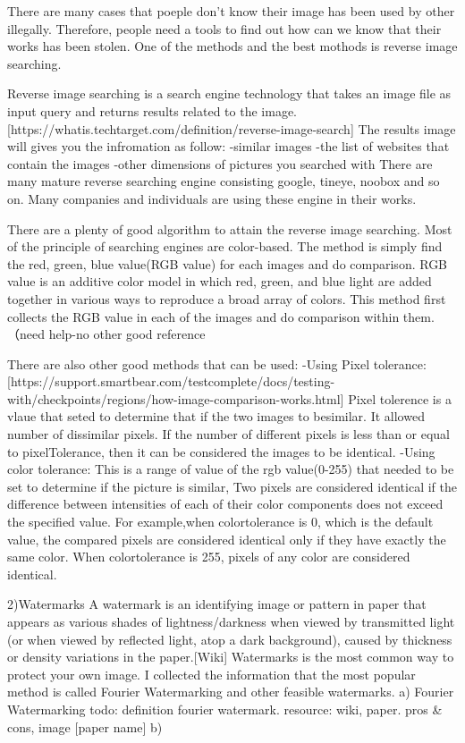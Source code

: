 There are many cases that poeple don't know their image has been used by other illegally.
Therefore, people need a tools to find out how can we know that their works has been stolen.
One of the methods and the best mothods is reverse image searching.

Reverse image searching is a search engine technology that takes an image file as input query and returns results related to the image.[https://whatis.techtarget.com/definition/reverse-image-search]
The results image will gives you the infromation as follow:
-similar images
-the list of websites that contain the images
-other dimensions of pictures you searched with
There are many mature reverse searching engine consisting google, tineye, noobox and so on.
Many companies and individuals are using these engine in their works.

There are a plenty of good algorithm to attain the reverse image searching.
Most of the principle of searching engines are color-based.
The method is simply find the red, green, blue value(RGB value) for each images and do comparison.
RGB value is an additive color model in which red, green, and blue light are added together in various ways to reproduce a broad array of colors.
This method first collects the RGB value in each of the images and do comparison within them. %
（need help-no other good reference

There are also other good methods that can be used:
-Using Pixel tolerance:
[https://support.smartbear.com/testcomplete/docs/testing-with/checkpoints/regions/how-image-comparison-works.html]
Pixel tolerence is a vlaue that seted to determine that if the two images to besimilar.
It allowed number of dissimilar pixels. 
If the number of different pixels is less than or equal to pixelTolerance, 
then it can be considered the images to be identical.
-Using color tolerance:
This is a range of value of the rgb value(0-255) that needed to be set to determine if the picture is similar,
Two pixels are considered identical if the difference between intensities of each of their color components does not exceed the specified value.
For example,when colortolerance is 0, which is the default value, the compared pixels are considered identical only if they have exactly the same color. 
When colortolerance is 255, pixels of any color are considered identical.


2)Watermarks  %
A watermark is an identifying image or pattern in paper that appears as various shades of lightness/darkness when viewed by transmitted light (or when viewed by reflected light, atop a dark background), 
caused by thickness or density variations in the paper.[Wiki]
Watermarks is the most common way to protect your own image.
I collected the information that the most popular method is called Fourier Watermarking and other feasible watermarks.
a) Fourier Watermarking
todo: definition fourier watermark. resource: wiki, paper. pros & cons, image [paper name]
b)






